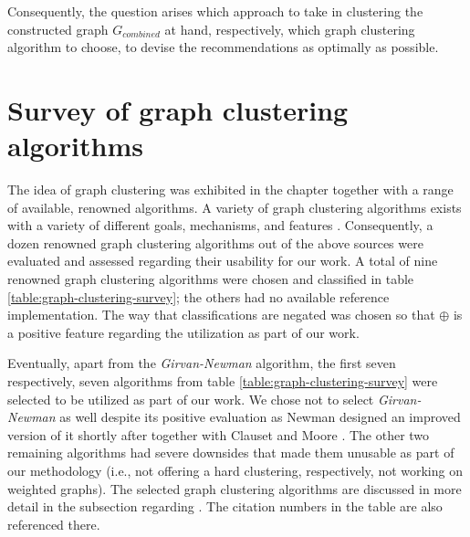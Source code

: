 \documentclass[12pt,a4paper]{report}
\begin{document}
Consequently, the question arises which approach to take in clustering the
constructed graph \(G_{combined}\) at hand, respectively, which graph
clustering algorithm to choose, to devise the recommendations as optimally as
possible.



\section{Survey of graph clustering algorithms} \label{sect:graph-clustering-algorithm-survey}

The idea of graph clustering was exhibited in the
\textit{} chapter together with a range of available,
renowned algorithms.
A variety of graph clustering algorithms exists with a variety of different
goals, mechanisms, and features \cite{lancichinetti2009community,
fortunato2010community, danon2005comparing}. Consequently, a dozen renowned
graph clustering algorithms out of the above sources were evaluated and
assessed regarding their usability for our work. A total of nine renowned graph
clustering algorithms were chosen and classified in table
\ref{table:graph-clustering-survey}; the others had no available reference implementation.
The way that classifications are negated was chosen so that $\oplus$ is a positive
feature regarding the utilization as part of our work.

Eventually, apart from the \textit{Girvan-Newman} algorithm, the first seven
respectively, seven algorithms from table \ref{table:graph-clustering-survey}
were selected to be utilized as part of our work. We chose not to select
\textit{Girvan-Newman} as well despite its positive evaluation as Newman
designed an improved version of it shortly after together with Clauset and
Moore \cite{clauset2004modularity}. The other two remaining algorithms had
severe downsides that made them unusable as part of our methodology (i.e., not
offering a hard clustering, respectively, not working on weighted graphs). The
selected graph clustering algorithms are discussed in more detail in the
\textit{} subsection regarding
\textit{}.
The citation numbers in the table are also referenced there.
\end{document}
